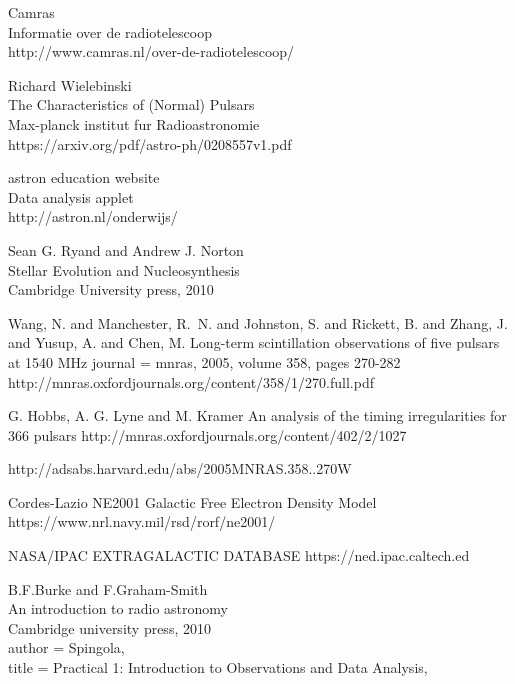 \documentclass[twoside,twocolumn]{article}
\begin{document}
\begin{thebibliography}{99} %
	
	
	Camras\\
	Informatie over de radiotelescoop\\
	http://www.camras.nl/over-de-radiotelescoop/
	
	Richard Wielebinski\\
	The Characteristics of (Normal) Pulsars\\
	Max-planck institut fur Radioastronomie\\
	https://arxiv.org/pdf/astro-ph/0208557v1.pdf
	
	astron education website\\
	Data analysis applet\\
	http://astron.nl/onderwijs/
	
	Sean G. Ryand and Andrew J. Norton\\
	Stellar Evolution and Nucleosynthesis\\
	Cambridge University press, 2010

	Wang, N. and Manchester, R.~N. and Johnston, S. and Rickett, B. and Zhang, J. and Yusup, A. and Chen, M.
	Long-term scintillation observations of five pulsars at 1540 MHz
	journal  = mnras, 2005, volume 358, pages 270-282
	http://mnras.oxfordjournals.org/content/358/1/270.full.pdf

	G. Hobbs, A. G. Lyne and M. Kramer
	An analysis of the timing irregularities for 366 pulsars
	http://mnras.oxfordjournals.org/content/402/2/1027
	
	http://adsabs.harvard.edu/abs/2005MNRAS.358..270W

Cordes-Lazio NE2001 Galactic Free Electron Density Model
https://www.nrl.navy.mil/rsd/rorf/ne2001/	

	NASA/IPAC EXTRAGALACTIC DATABASE
   https://ned.ipac.caltech.ed

	B.F.Burke and F.Graham-Smith\\
	An introduction to radio astronomy\\
	Cambridge university press, 2010\\
	
		author   = {{Spingola}},\\
		title    = {Practical 1: Introduction to Observations and Data Analysis},
	
\end{thebibliography}

	
	
	
\end{document}
